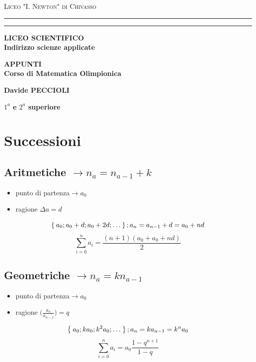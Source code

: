 \documentclass[12pt, a4paper,oneside]{report}
\begin{document}
\begin{titlepage}
	\begin{center}
		{{\Large{\textsc{Liceo "I. Newton" di Chivasso}}}} \rule[0.1cm]{15.8cm}{0.1mm}
		\rule[0.5cm]{15.8cm}{0.6mm}
		{\small{\bf LICEO SCIENTIFICO\\
				Indirizzo scienze applicate}}
	\end{center}
	\vspace{15mm}
	\begin{center}
		\vspace{8cm}
		{\LARGE{\bf APPUNTI}}\\
		\vspace{19mm} {\large{\bf Corso di Matematica Olimpionica}}
	\end{center}
	\vspace{50mm}
	\par
	\noindent
	\begin{minipage}[t]{0.47\textwidth}
		{\large{\bf Davide PECCIOLI}}
	\end{minipage}
	\hfill
	\vspace{3cm}
	\begin{center}
		{\large{\bf $1^a$ e $2^a$ superiore }}
	\end{center}
\end{titlepage}
\chapter{Successioni}
	\section{Aritmetiche  $\to n_a=n_{a-1}+k$}
	\begin{itemize}
	\item punto di partenza$\to a_0$
	\item ragione $\Delta a=d$
	\end{itemize}
	\[
	\Set{a_0;a_0+d;a_0+2d; \dots}; a_n=a_{n-1}+d=a_0+nd
	\]
	\[
	\sum_{i=0}^n a_i=\frac{(n+1)(a_0+a_0+nd)}{2}
	\]
	\section{Geometriche $\to n_a=kn_{a-1}$}
	\begin{itemize}
		\item punto di partenza$\to a_0$
		\item ragione $\bigl(\frac{a_n}{a_{n-1}}\bigr)=q$
	\end{itemize}
	\[
	\Set{a_0;ka_0;k^{2}a_0; \dots}; a_n=ka_{n-1}=k^{n}a_0
	\]
	\[
	\sum_{i=0}^{n}a_i=a_0\frac{1-q^{n+1}}{1-q}
	\]
\end{document}
